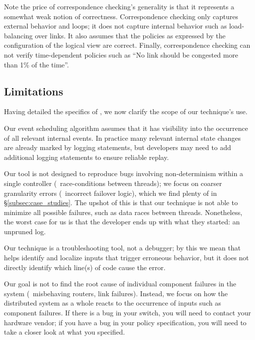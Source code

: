 {Note the price of correspondence checking's generality is that it represents
a somewhat weak notion of
correctness. Correspondence checking only captures external behavior and
loops; it does not capture internal behavior such as load-balancing
over links. It also assumes that the policies as expressed by the
configuration of the logical view are correct. Finally, correspondence
checking can not verify
time-dependent policies such as ``No link should be congested more than 1\% of
the time''.
}

\subsection{Limitations}
\label{subsec:non_goals}

Having detailed the specifics of \simulator, we now
clarify the scope of our technique's use.

 Our event scheduling algorithm assumes that
it has visibility into the occurrence of all relevant internal events. In
practice many relevant internal state changes are already marked by logging
statements, but developers may need to add additional
logging statements to ensure reliable replay.

 Our tool is not designed to reproduce bugs
involving non-determinism within a single controller (\eg~race-conditions between threads);
we focus on coarser granularity errors (\eg~incorrect failover logic), which we find plenty of
in \S\ref{subsec:case_studies}. The upshot of
this is that our technique is not able to minimize all possible failures, such as
data races between threads.
Nonetheless, the worst case for us is that the developer ends up with what they started:
an unpruned log.


 Our technique is a troubleshooting tool, not a debugger;
by this we mean that \simulator{} helps identify and localize inputs that
trigger erroneous behavior, but it does not directly identify which
line(s) of code cause the error.

 Our goal is not to find the root
cause of individual component failures in the system (\eg~misbehaving routers,
link failures). Instead, we focus on
how the distributed system as a whole reacts to the occurrence of inputs such
as component failures.
If there is a bug in your switch, you will need to contact your hardware vendor;
if you have a bug in your policy specification, you will need to take a closer look at what you specified.

